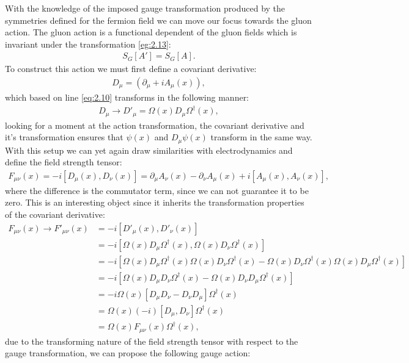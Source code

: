 \documentclass[english,twoside,openright]{UH_TCM_MSc}
\begin{document}
With the knowledge of the imposed gauge transformation produced by the symmetries defined for the fermion field we can move our focus towards the gluon action. The gluon action is a functional dependent of the gluon fields which is invariant under the transformation \ref{eg:2.13}:
\begin{align}
    S_G[A'] = S_G[A].
\end{align}
To construct this action we must first define a covariant derivative:
\begin{align}
    D_\mu = (\partial_\mu + iA_\mu(x)),
\end{align}
which based on line \ref{eq:2.10} transforms in the following manner:
\begin{align}
    D_\mu \rightarrow D'_\mu = \Omega(x)D_\mu\Omega^\dagger(x),
\end{align}
looking for a moment at the action transformation, the covariant derivative and it's transformation ensures that $\psi(x)$ and $D_\mu\psi(x)$ transform in the same way. With this setup we can yet again draw similarities with electrodynamics and define the field strength tensor:
\begin{align}
    F_{\mu\nu}(x) = -i[D_\mu(x),D_\nu(x)] = \partial_\mu A_\nu(x) - \partial_\nu A_\mu(x) + i[A_\mu(x),A_\nu(x)], \label{strength_tensor}
\end{align}
where the difference is the commutator term, since we can not guarantee it to be zero. This is an interesting object since it inherits the transformation properties of the covariant derivative:
\begin{align}
    F_{\mu\nu}(x) \rightarrow F'_{\mu\nu}(x) &= -i[D'_\mu(x),D'_\nu(x)] \\
    &=  -i[\Omega(x)D_\mu\Omega^\dagger(x), \Omega(x)D_\nu\Omega^\dagger(x)] \\
    &= -i[\Omega(x)D_\mu\Omega^\dagger(x)\Omega(x)D_\nu\Omega^\dagger(x) - \Omega(x)D_\nu\Omega^\dagger(x)\Omega(x)D_\mu\Omega^\dagger(x)] \\
    &=  -i[\Omega(x)D_\mu D_\nu\Omega^\dagger(x) - \Omega(x)D_\nu D_\mu\Omega^\dagger(x)] \\
    &= -i\Omega(x)[D_\mu D_\nu- D_\nu D_\mu]\Omega^\dagger(x) \\
    &=\Omega(x)(-i)[D_\mu,D_\nu]\Omega^\dagger(x) \\
    &= \Omega(x)F_{\mu\nu}(x) \Omega^\dagger(x),
\end{align}
due to the transforming nature of the field strength tensor with respect to the gauge transformation, we can propose the following gauge action:
\end{document}
